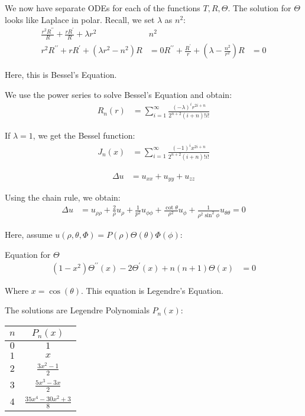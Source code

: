 We now have separate ODEs for each of the functions $T, R, \Theta$. The solution for $\Theta$ looks like Laplace in polar. Recall, we set $\lambda$ as $n^2$:
%
\begin{align}
  \frac{r^2 R^{\prime\prime}}{R} + \frac{r R^\prime}{R} + \lambda r^2 & n^2\\
  r^2 R^{\prime\prime} + rR^\prime + (\lambda r^2 - n^2)R & = 0
  R^{\prime\prime} + \frac{R^\prime}{r} + (\lambda - \frac{n^2}{r^2})R & = 0
\end{align}

Here, this is Bessel's Equation.

We use the power series to solve Bessel's Equation and obtain:
%
\begin{align}
  R_n(r) & = \sum^\infty_{i = 1} \frac{(-\lambda)^i r^{2i + n}}{2^{n + 2}(i + n)! i!}
\end{align}

If $\lambda = 1$, we get the Bessel function:
%
\begin{align}
  J_n(x) & = \sum^\infty_{i = 1} \frac{(-1)^i x^{2i + n}}{2^{n + 2}(i + n)! i!}
\end{align}

%
\begin{align}
  \Delta u & = u_{xx} + u_{yy} + u_{zz}
\end{align}

Using the chain rule, we obtain:
%
\begin{align}
  \Delta u & =
  u_{\rho \rho} +
  \frac{2}{\rho}u_\rho +
  \frac{1}{p^2} u_{\phi\phi} +
  \frac{\cot \theta}{\rho^2} u_\phi +
  \frac{1}{\rho^2 \sin^2 \phi} u_{\theta\theta} = 0
\end{align}

Here, assume $u(\rho, \theta, \Phi) = P(\rho)\Theta(\theta)\Phi(\phi)$:

Equation for $\Theta$
%
\begin{align}
  (1 - x^2) \Theta^{\prime\prime}(x) -
  2 \Theta^\prime(x) +
  n(n + 1) \Theta(x)
  & = 0
\end{align}

Where $x = \cos(\theta)$. This equation is Legendre's Equation.

The solutions are Legendre Polynomials $P_n(x)$:
%
\begin{center}
  \begin{tabular}{c|c}
    $n$ & $P_n(x)$\\
    \hline
    $0$ & $1$\\
    $1$ & $x$\\
    $2$ & $\frac{3x^2 - 1}{2}$\\
    $3$ & $\frac{5x^3 - 3x}{2}$\\
    $4$ & $\frac{35 x^4 - 30x^2 + 3}{8}$
  \end{tabular}
\end{center}

